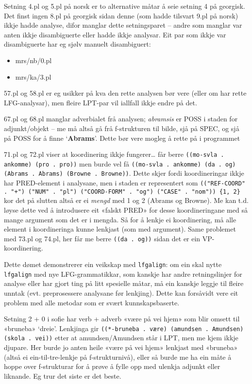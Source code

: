 \documentclass[11pt,a4paper,oneside,draft]{book}
\newcommand{\p}[1]{`\textbf{#1}'}
\begin{document}
Setning 4.pl og 5.pl på norsk er to alternative måtar å seie setning 4
på georgisk. Det finst ingen 8.pl på georgisk sidan denne (som hadde
tilsvart 9.pl på norsk) ikkje hadde analyse, difor manglar dette
setningsparet -- andre som manglar var anten ikkje disambiguerte eller
hadde ikkje analysar. Eit par som ikkje var disambiguerte har eg sjølv
manuelt disambiguert:
\begin{itemize}
\item mrs/nb/0.pl
\item mrs/ka/3.pl
\end{itemize}
57.pl og 58.pl er eg usikker på kva den rette analysen bør vere (eller
om har rette LFG-analysar), men fleire LPT-par vil iallfall ikkje
endre på det.

67.pl og 68.pl manglar adverbialet frå analysen; \emph{abramsis} er POSS i
staden for adjunkt/objekt -- me må altså gå frå f-strukturen til
bilde, sjå på SPEC, og sjå på POSS for å finne \p{Abrams}. Dette bør
vere mogleg å rette på i programmet

71.pl og 72.pl viser at koordinering ikkje fungerer\ldots{} får berre
\texttt{((mo-svla . ankomme) (pro . pro))} men burde vel få \texttt{((mo-svla . ankomme) (da . og) (Abrams . Abrams) (Browne . Browne))}.  Dette
skjer fordi koordineringar ikkje har PRED-element i analysane, men i
staden er representert som \texttt{(("REF-COORD" . "+") ("NUM" . "pl") ("COORD-FORM" . "og") ("CASE" . "nom")) \{1, 2\}} kor det på slutten
altså er ei \emph{mengd} med 1 og 2 (Abrams og Browne). Me kan t.d. løyse
dette ved å introdusere eit «falskt PRED» for desse koordineringane
med så mange argument som det er i mengda. Så for å lenkje ei
koordinering, må alle element i koordineringa kunne lenkjast (som med
argument). Same problemet med 73.pl og 74.pl, her får me berre \texttt{((da . og))} sidan det er ein VP-koordinering.

Dette dømet demonstrerer ein veikskap med \texttt{lfgalign}: om ein skal
nytte \texttt{lfgalign} med nye LFG-grammatikkar, som kanskje har andre
retningslinjer for analyse eller har gjort ting på litt spesielle
måtar, må ein kanskje leggje til fleire unntak (evt. preprosessere
analysane før lenkjing). Dette kan forsåvidt vere eit problem med alle
metodar som er svært kunnskapsbaserte.


Setning 2 + 0 i sofie har verb + adverb «være på vei hjem» som blir
omsett til «bruneba» `dreie'. Lenkjinga gir \texttt{((*-bruneba . være) (amundsen . Amundsen) (skola . vei))} etter at amundsen/Amundsen står
i LPT, men me kjem ikkje djupare. Her burde jo anten heile «være på
vei hjem» lenkjast med «bruneba» (altså ei ein-til-tre-lenkje på
f-strukturnivå), eller så burde me ha ein måte å hoppe over
f-strukturar for å prøve å fylle opp med ulenkja adjunkt eller
liknande. Eg trur det siste er det beste.
\end{document}
